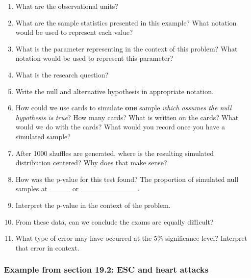 \documentclass[
]{report}
\newcommand{\rgs}{\vspace{12pt}} %
\begin{document}
\begin{enumerate}
\def\labelenumi{\arabic{enumi}.}
\item
  What are the observational units?
  \rgs
\item
  What are the sample statistics presented in this example? What notation would be used to represent each value?
  \rgs
\item
  What is the parameter representing in the context of this problem? What notation would be used to represent this parameter?
  \rgs
  \rgs
\item
  What is the research question?
  \rgs
\item
  Write the null and alternative hypothesis in appropriate notation.
  \rgs
\item
  How could we use cards to simulate \textbf{one} sample \emph{which assumes the null hypothesis is true}? How many cards? What is written on the cards? What would we do with the cards? What would you record once you have a simulated sample?
  \rgs
  \rgs
  \rgs
\item
  After 1000 shuffles are generated, where is the resulting simulated distribution centered? Why does that make sense?
  \rgs
  \rgs
\item
  How was the p-value for this test found? The proportion of simulated null samples at \_\_\_\_ or \_\_\_\_\_\_\_\_\_\_\_.
  \rgs
\item
  Interpret the p-value in the context of the problem.
  \rgs
  \rgs
\item
  From these data, can we conclude the exams are equally difficult?
  \rgs
\item
  What type of error may have occurred at the 5\% significance level? Interpret that error in context.
  \rgs
  \rgs
\end{enumerate}

\hypertarget{example-from-section-19.2-esc-and-heart-attacks}{%
\subsubsection*{Example from section 19.2: ESC and heart attacks}\label{example-from-section-19.2-esc-and-heart-attacks}}
\end{document}
